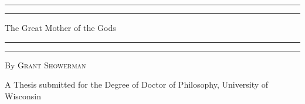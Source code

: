 \documentclass[a4paper, 11pt, oneside, polutonikogreek, english]{article}
\begin{document}
\begin{titlepage} %
	\centering %
	\scshape %

	
	\rule{\textwidth}{1.6pt}\vspace*{-\baselineskip}\vspace*{2pt} %
	\rule{\textwidth}{0.4pt} %
	
	\vspace{0.75\baselineskip} %

        {\LARGE The Great Mother of the Gods \\} %
	
	\vspace{0.75\baselineskip} %
	
	\rule{\textwidth}{0.4pt}\vspace*{-\baselineskip}\vspace{3.2pt} %
	\rule{\textwidth}{1.6pt} %
	
	\vspace{1\baselineskip} %
	
	
	{By \scshape\Large Grant Showerman\\} %
	
	\vspace*{1\baselineskip} %
	
	
	\vspace{1\baselineskip} %

        {\small A Thesis submitted for the Degree of Doctor of Philosophy, University of Wisconsin}

	
	

\end{titlepage}
\end{document}
